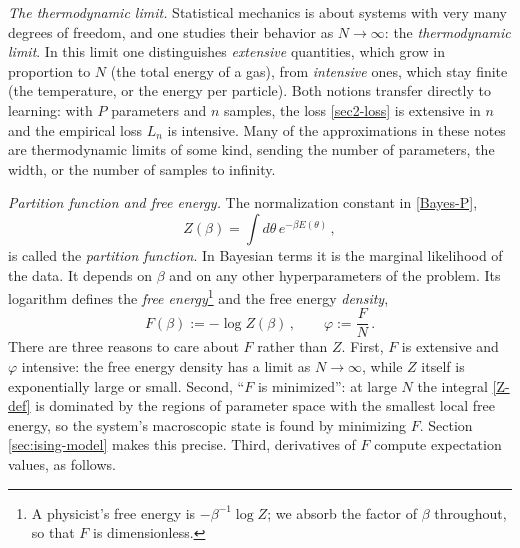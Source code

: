 \documentclass[11pt]{article}
\begin{document}
\emph{The thermodynamic limit.} Statistical mechanics is about systems with very many degrees of freedom, and one studies their behavior as $N\to\infty$: the \emph{thermodynamic limit}. In this limit one distinguishes \emph{extensive} quantities, which grow in proportion to $N$ (the total energy of a gas), from \emph{intensive} ones, which stay finite (the temperature, or the energy per particle). Both notions transfer directly to learning: with $P$ parameters and $n$ samples, the loss \eqref{sec2-loss} is extensive in $n$ and the empirical loss $L_n$ is intensive. Many of the approximations in these notes are thermodynamic limits of some kind, sending the number of parameters, the width, or the number of samples to infinity.

\emph{Partition function and free energy.} The normalization constant in \eqref{Bayes-P},
%
\begin{equation}
    Z(\beta) = \int d\theta\, e^{-\beta E(\theta)}\,, \label{Z-def}
\end{equation}
%
is called the \emph{partition function}. In Bayesian terms it is the marginal likelihood of the data. It depends on $\beta$ and on any other hyperparameters of the problem. Its logarithm defines the \emph{free energy}\footnote{A physicist's free energy is $-\beta^{-1}\log Z$; we absorb the factor of $\beta$ throughout, so that $F$ is dimensionless.} and the free energy \emph{density},
%
\begin{equation}
    F(\beta) := -\log Z(\beta)\,,\qquad \varphi := \frac{F}{N}\,. \label{F-def}
\end{equation}
%
There are three reasons to care about $F$ rather than $Z$. First, $F$ is extensive and $\varphi$ intensive: the free energy density has a limit as $N\to\infty$, while $Z$ itself is exponentially large or small. Second, ``$F$ is minimized'': at large $N$ the integral \eqref{Z-def} is dominated by the regions of parameter space with the smallest local free energy, so the system's macroscopic state is found by minimizing $F$. Section \ref{sec:ising-model} makes this precise. Third, derivatives of $F$ compute expectation values, as follows.
\end{document}
